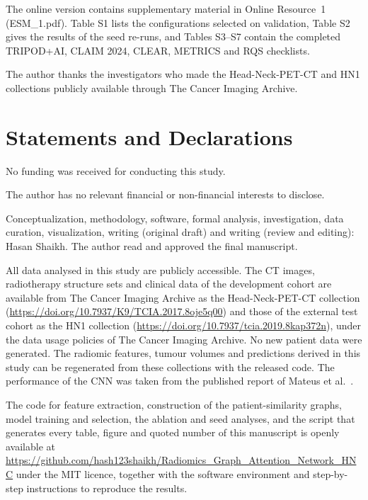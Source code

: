 \documentclass[pdflatex,iicol,sn-nature]{sn-jnl}
\begin{document}
The online version contains supplementary material in Online Resource~1 (ESM\_1.pdf). Table S1 lists the configurations selected on validation, Table S2 gives the results of the seed re-runs, and Tables S3--S7 contain the completed TRIPOD+AI, CLAIM 2024, CLEAR, METRICS and RQS checklists.

The author thanks the investigators who made the Head-Neck-PET-CT and HN1 collections publicly available through The Cancer Imaging Archive.

\section*{Statements and Declarations}

No funding was received for conducting this study.

The author has no relevant financial or non-financial interests to disclose.

Conceptualization, methodology, software, formal analysis, investigation, data curation, visualization, writing (original draft) and writing (review and editing): Hasan Shaikh. The author read and approved the final manuscript.

All data analysed in this study are publicly accessible. The CT images, radiotherapy structure sets and clinical data of the development cohort are available from The Cancer Imaging Archive as the Head-Neck-PET-CT collection (\url{https://doi.org/10.7937/K9/TCIA.2017.8oje5q00}) and those of the external test cohort as the HN1 collection (\url{https://doi.org/10.7937/tcia.2019.8kap372n}), under the data usage policies of The Cancer Imaging Archive. No new patient data were generated. The radiomic features, tumour volumes and predictions derived in this study can be regenerated from these collections with the released code. The performance of the CNN was taken from the published report of Mateus et al.~\cite{mateus2023}.

The code for feature extraction, construction of the patient-similarity graphs, model training and selection, the ablation and seed analyses, and the script that generates every table, figure and quoted number of this manuscript is openly available at \url{https://github.com/hash123shaikh/Radiomics_Graph_Attention_Network_HNC} under the MIT licence, together with the software environment and step-by-step instructions to reproduce the results.
\end{document}
